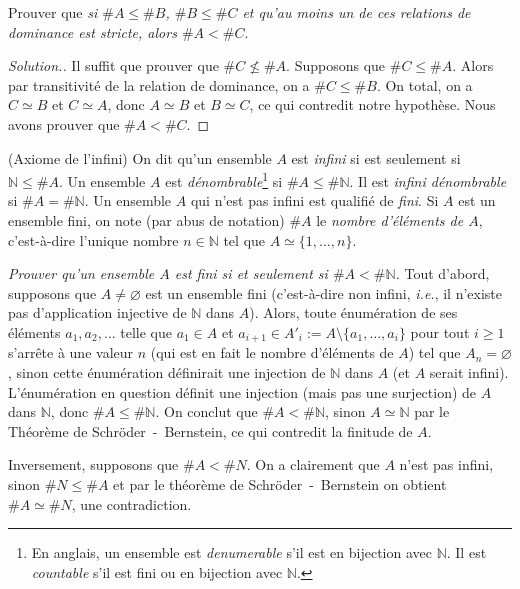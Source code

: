 \documentclass[french,course,oneside,theoremnosection]{lecture}
\newcommand{\N}{\mathbb{N}}
\begin{document}
\begin{exercise}\label{exo:transleq}
Prouver que \emph{si $\#A \leq \#B$, $\#B \leq \# C$ et qu'au moins un de ces relations de dominance est stricte, alors $\# A < \# C$}.
\end{exercise}
\begin{proof}[Solution.]
Il suffit que prouver que $\# C \not\leq \#A$. Supposons que $\# C \leq \#A$. Alors par transitivité de la relation de dominance,  on a  $\# C \leq \# B$. On total, on a $C \simeq B$ et $C \simeq A$, donc $A \simeq B$ et $B \simeq C$, ce qui contredit notre hypothèse. Nous avons prouver que $\# A < \# C $.
\end{proof}

\begin{definition}(Axiome de l'infini)
On dit qu'un ensemble $A$ est \emph{infini} si est seulement si $\N \leq \#A$. Un ensemble $A$ est \emph{dénombrable}\footnote{En anglais, un ensemble est \emph{denumerable} s'il est en bijection avec $\N$. Il est  \emph{countable} s'il est fini ou en bijection avec $\N$.} si $\# A \leq \# \N$. Il est \emph{infini dénombrable} si $\# A =\# \N$. Un ensemble $A$ qui n'est pas infini est qualifié de \emph{fini}. Si $A$ est un ensemble fini, on note (par abus de notation) $\#A$ le \emph{nombre d'éléments de $A$}, c'est-à-dire l'unique nombre $n\in \N$ tel que $A\simeq \{1, \ldots, n\}$.
\end{definition}

\begin{exercise}
\emph{Prouver qu'un ensemble $A$ est fini si et seulement si $\#A < \#\N$.} Tout d'abord, supposons que $A\neq \varnothing$ est un ensemble fini (c'est-à-dire non infini, \emph{i.e.}, il n'existe pas d'application injective de $\N$ dans $A$). Alors, toute énumération de ses éléments $a_1, a_2, \ldots$ telle que $a_1\in A$ et $a_{i+1}\in A'_{i}:= A\setminus\{a_1, \ldots, a_i\}$ pour tout $i\geq 1$ s'arrête à une valeur $n$ (qui est en fait le nombre d'éléments de $A$) tel que $A_{n}=\varnothing$, sinon cette énumération définirait une injection de $\N$ dans $A$ (et $A$ serait infini). L'énumération en question définit une injection (mais pas une surjection) de $A$ dans $\N$, donc $\# A \leq \# \N$. On conclut que $\# A < \# \N$, sinon $A \simeq \N$ par le Théorème de Schröder~-~Bernstein, ce qui contredit la finitude de $A$.

Inversement, supposons que $\# A < \# N$. On a clairement que $A$ n'est pas infini, sinon $\# N \leq \# A$ et  par le théorème de Schröder~-~Bernstein on obtient $\# A \simeq \# N$, une contradiction.

\end{exercise}
\end{document}

